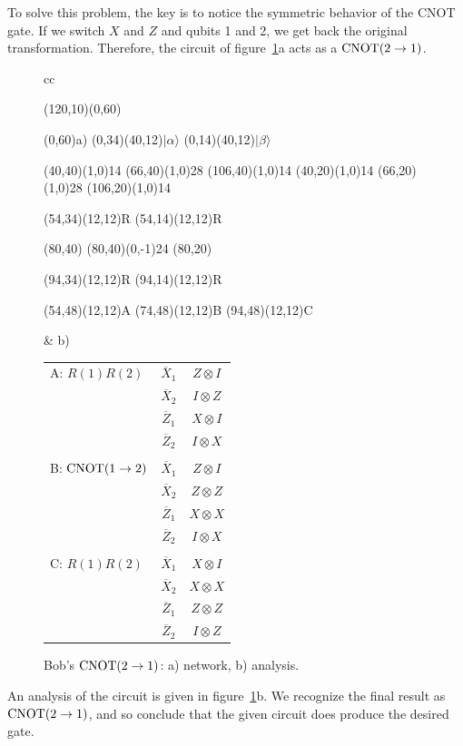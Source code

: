 To solve this problem, the key is to notice the symmetric behavior of
the CNOT gate.  If we switch $X$ and $Z$ and qubits 1 and 2, we get
back the original transformation.  Therefore, the circuit of
figure~\ref{fig:CNOT}a acts as a ${\rm CNOT} (2 \rightarrow 1)$.
\begin{figure}
\centering
\begin{tabular}{cc}
\begin{picture}(120,10)(0,60)

\put(0,60){a)}
\put(0,34){\makebox(40,12){$|\alpha\rangle$}}
\put(0,14){\makebox(40,12){$|\beta\rangle$}}

\put(40,40){\line(1,0){14}}
\put(66,40){\line(1,0){28}}
\put(106,40){\line(1,0){14}}
\put(40,20){\line(1,0){14}}
\put(66,20){\line(1,0){28}}
\put(106,20){\line(1,0){14}}

\put(54,34){\framebox(12,12){R}}
\put(54,14){\framebox(12,12){R}}

\put(80,40){}
\put(80,40){\line(0,-1){24}}
\put(80,20){}

\put(94,34){\framebox(12,12){R}}
\put(94,14){\framebox(12,12){R}}

\put(54,48){\makebox(12,12){A}}
\put(74,48){\makebox(12,12){B}}
\put(94,48){\makebox(12,12){C}}

\end{picture}
& b)
\begin{tabular}[t]{lcc}
A: $R(1) R(2)$ & $\overline{X}_1$ & $Z \otimes I$ \\
& $\overline{X}_2$ & $I \otimes Z$ \\
& $\overline{Z}_1$ & $X \otimes I$ \\
& $\overline{Z}_2$ & $I \otimes X$ \\
\\
B: ${\rm CNOT}(1 \rightarrow 2)$ & $\overline{X}_1$ & $Z \otimes I$ \\
& $\overline{X}_2$ & $Z \otimes Z$ \\
& $\overline{Z}_1$ & $X \otimes X$ \\
& $\overline{Z}_2$ & $I \otimes X$ \\
\\
C: $R(1) R(2)$ & $\overline{X}_1$ & $X \otimes I$ \\
& $\overline{X}_2$ & $X \otimes X$ \\
& $\overline{Z}_1$ & $Z \otimes Z$ \\
& $\overline{Z}_2$ & $I \otimes Z$
\end{tabular}
\end{tabular}
\caption{Bob's ${\rm CNOT}(2 \rightarrow 1)$: a) network, b) analysis.}
\label{fig:CNOT}
\end{figure}
An analysis of the circuit is given in figure~\ref{fig:CNOT}b.
We recognize the final result as ${\rm CNOT}(2 \rightarrow 1)$, and so
conclude that the given circuit does produce the desired gate.

